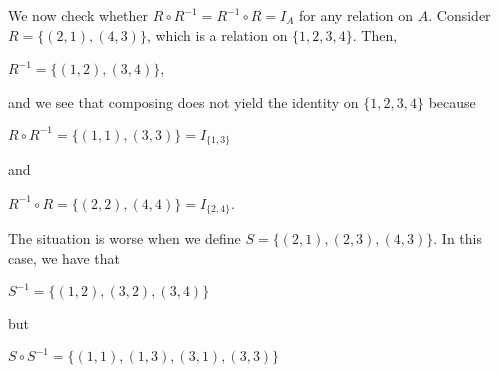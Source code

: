 \documentclass[12pt, a4paper]{article}
\begin{document}
We now check whether $R\circ R^{-1}=R^{-1}\circ R=I_A$ for any relation on $A$. Consider $R=\{(2,1),(4,3)\}$, which is a relation on $\{1,2,3,4\}$. Then,\par

\begin{flushleft}

\centerline{$R^{-1}=\{(1,2),(3,4)\}$,}

\vspace{4mm}

and we see that composing does not yield the identity on $\{1,2,3,4\}$ because\par

\vspace{4mm}

\centerline{$R\circ R^{-1}=\{(1,1),(3,3)\}=I_{\{1,3\}}$}

\vspace{4mm}

and\par

\vspace{4mm}

\centerline{$R^{-1}\circ R=\{(2,2),(4,4)\}=I_{\{2,4\}}$.}

\vspace{4mm}

The situation is worse when we define $S=\{(2,1),(2,3),(4,3)\}$. In this case, we have that\par

\vspace{4mm}

\centerline{$S^{-1}=\{(1,2),(3,2),(3,4)\}$}

\vspace{4mm}

but\par

\vspace{4mm}

\centerline{$S\circ S^{-1}=\{(1,1),(1,3),(3,1),(3,3)\}$}

\end{flushleft}

\newpage
\end{document}
